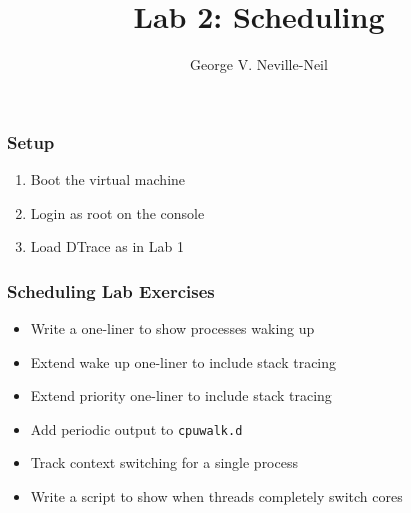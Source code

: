 \documentclass[pdftex,handout]{beamer}
\begin{document}

\title{Lab 2: Scheduling}
\author[shortname]{George V. Neville-Neil}

\begin{frame}
  \frametitle{Setup}
  \begin{enumerate}
  \item Boot the virtual machine
  \item Login as root on the console
  \item Load DTrace as in Lab 1
  \end{enumerate}
\end{frame}

\begin{frame}[fragile]
  \frametitle{Scheduling Lab Exercises}
  \begin{itemize}
  \item Write a one-liner to show processes waking up
  \item Extend wake up one-liner to include stack tracing
  \item Extend priority one-liner to include stack tracing
  \item Add periodic output to \verb+cpuwalk.d+
  \item Track context switching for a single process
  \item Write a script to show when threads completely switch cores
  \end{itemize}
\end{frame}
\end{document}
